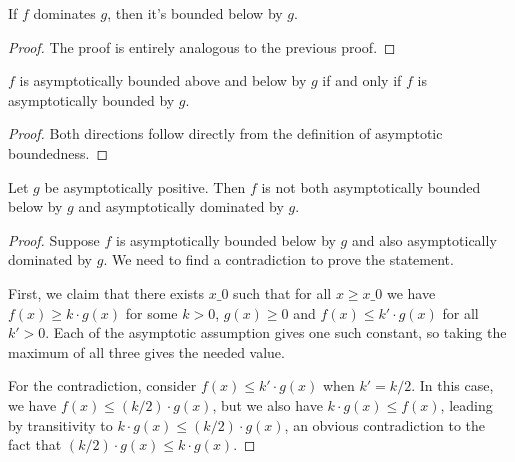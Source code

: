 \begin{lemma}
    \label{lemma:asymp_bounded_below_of_left_dom}
    \leanok
    If $f$ dominates $g$, then it's bounded below by $g$.
\end{lemma}

\begin{proof}
    \leanok
    The proof is entirely analogous to the previous proof.
\end{proof}

\begin{lemma}
    \label{lemma:asymp_bounded_iff}
    \leanok
    $f$ is asymptotically bounded above and below by $g$ if and only if $f$ is 
    asymptotically bounded by $g$.
\end{lemma}

\begin{proof}
    \leanok
    Both directions follow directly from the definition of asymptotic boundedness. 
\end{proof}

\begin{lemma}
    \label{lemma:not_asymp_pos_bounded_below_and_right_dom}
    \leanok
    Let $g$ be asymptotically positive. Then $f$ is not both asymptotically bounded 
    below by $g$ and asymptotically dominated by $g$.
\end{lemma}

\begin{proof}
    \leanok
    Suppose $f$ is asymptotically bounded below by $g$ and also asymptotically dominated
    by $g$. We need to find a contradiction to prove the statement. 

    First, we claim that there exists $x\_0$ such that for all $x \ge x\_0$ we have 
    $f(x) \ge k \cdot g(x)$ for some $k > 0$, $g(x) \ge 0$ and $f(x) \le k' \cdot g(x)$ 
    for all $k' > 0$. Each of the asymptotic assumption gives one such constant, so
    taking the maximum of all three gives the needed value.

    For the contradiction, consider $f(x) \le k' \cdot g(x)$ when $k' = k / 2$.
    In this case, we have $f(x) \le (k / 2) \cdot g(x)$, but we also have
    $k \cdot g(x) \le f(x)$, leading by transitivity to $k \cdot g(x) \le (k / 2) \cdot g(x)$,
    an obvious contradiction to the fact that $(k / 2) \cdot g(x) \le k \cdot g(x)$.
\end{proof}

